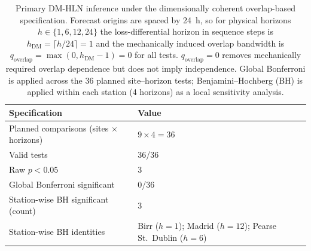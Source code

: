 \begin{table}[t]
\centering
\small
\caption{Primary DM-HLN inference under the dimensionally coherent overlap-based specification.
Forecast origins are spaced by 24~h, so for physical horizons $h\in\{1,6,12,24\}$ the loss-differential horizon in sequence steps is $h_{\text{DM}}=\lceil h/24\rceil=1$ and the mechanically induced overlap bandwidth is $q_{\text{overlap}}=\max(0,h_{\text{DM}}-1)=0$ for all tests.  $q_{\text{overlap}}=0$ removes mechanically required overlap dependence but does not imply independence.
Global Bonferroni is applied across the 36 planned site--horizon tests; Benjamini--Hochberg (BH) is applied within each station (4 horizons) as a local sensitivity analysis.}
\label{tab:dm_q0}
\begin{tabular}{p{}p{}}
\toprule
Specification & Value \\
\midrule
Planned comparisons (sites $\times$ horizons) & $9\times 4 = 36$ \\
Valid tests & 36/36 \\
Raw $p<0.05$ & 3 \\
Global Bonferroni significant & 0/36 \\
Station-wise BH significant (count) & 3 \\
Station-wise BH identities & Birr ($h=1$); Madrid ($h=12$); Pearse St.\ Dublin ($h=6$) \\
\bottomrule
\end{tabular}
\end{table}
